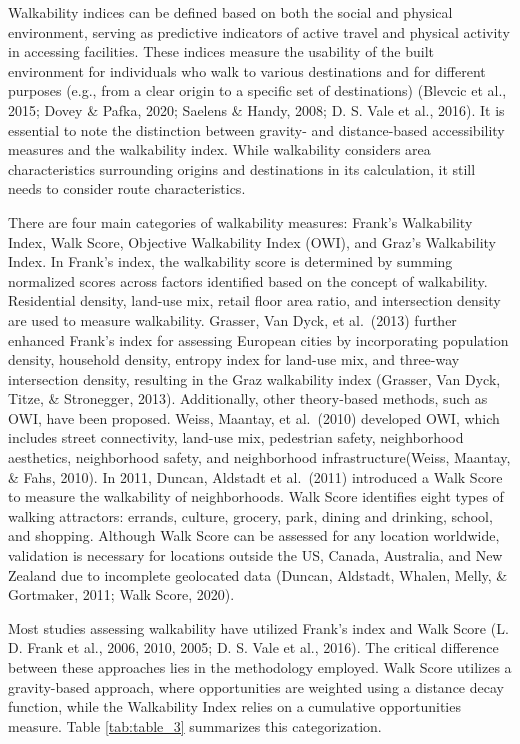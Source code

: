 \documentclass[
11pt, %
oneside, %
english, %
singlespacing, %
]{macthesis} %
\begin{document}
Walkability indices can be defined based on both the social and physical environment, serving as predictive indicators of active travel and physical activity in accessing facilities. These indices measure the usability of the built environment for individuals who walk to various destinations and for different purposes (e.g., from a clear origin to a specific set of destinations) (Blevcic et al., 2015; Dovey \& Pafka, 2020; Saelens \& Handy, 2008; D. S. Vale et al., 2016). It is essential to note the distinction between gravity- and distance-based accessibility measures and the walkability index. While walkability considers area characteristics surrounding origins and destinations in its calculation, it still needs to consider route characteristics.

There are four main categories of walkability measures: Frank's Walkability Index, Walk Score, Objective Walkability Index (OWI), and Graz's Walkability Index. In Frank's index, the walkability score is determined by summing normalized scores across factors identified based on the concept of walkability. Residential density, land-use mix, retail floor area ratio, and intersection density are used to measure walkability. Grasser, Van Dyck, et al.~(2013) further enhanced Frank's index for assessing European cities by incorporating population density, household density, entropy index for land-use mix, and three-way intersection density, resulting in the Graz walkability index (Grasser, Van Dyck, Titze, \& Stronegger, 2013). Additionally, other theory-based methods, such as OWI, have been proposed. Weiss, Maantay, et al.~(2010) developed OWI, which includes street connectivity, land-use mix, pedestrian safety, neighborhood aesthetics, neighborhood safety, and neighborhood infrastructure(Weiss, Maantay, \& Fahs, 2010). In 2011, Duncan, Aldstadt et al.~(2011) introduced a Walk Score to measure the walkability of neighborhoods. Walk Score identifies eight types of walking attractors: errands, culture, grocery, park, dining and drinking, school, and shopping. Although Walk Score can be assessed for any location worldwide, validation is necessary for locations outside the US, Canada, Australia, and New Zealand due to incomplete geolocated data (Duncan, Aldstadt, Whalen, Melly, \& Gortmaker, 2011; Walk Score, 2020).

Most studies assessing walkability have utilized Frank's index and Walk Score (L. D. Frank et al., 2006, 2010, 2005; D. S. Vale et al., 2016). The critical difference between these approaches lies in the methodology employed. Walk Score utilizes a gravity-based approach, where opportunities are weighted using a distance decay function, while the Walkability Index relies on a cumulative opportunities measure. Table \ref{tab:table_3} summarizes this categorization.
\end{document}
